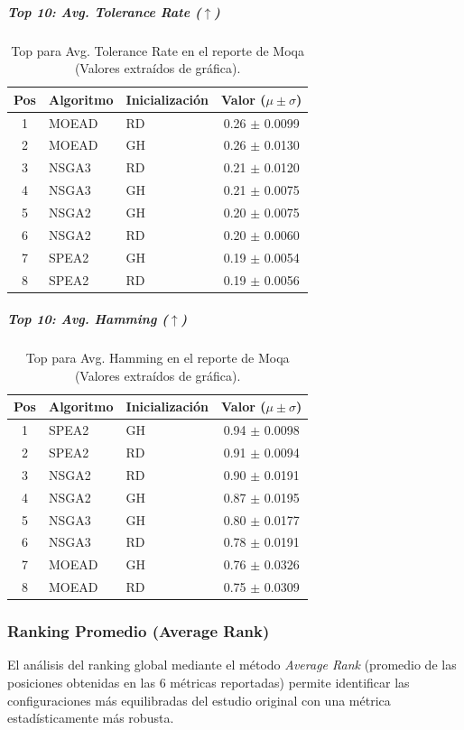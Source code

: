 \documentclass[a4paper,10pt]{article}
\begin{document}
\subparagraph{Top 10: Avg. Tolerance Rate ($\uparrow$)}
\begin{table}[H]
    \centering
    \begin{tabular}{cllc}
        \toprule
        Pos & Algoritmo & Inicialización & Valor ($\mu \pm \sigma$) \\
        \midrule
        1 & MOEAD & RD & 0.26 $\pm$ 0.0099 \\
        2 & MOEAD & GH & 0.26 $\pm$ 0.0130 \\
        3 & NSGA3 & RD & 0.21 $\pm$ 0.0120 \\
        4 & NSGA3 & GH & 0.21 $\pm$ 0.0075 \\
        5 & NSGA2 & GH & 0.20 $\pm$ 0.0075 \\
        6 & NSGA2 & RD & 0.20 $\pm$ 0.0060 \\
        7 & SPEA2 & GH & 0.19 $\pm$ 0.0054 \\
        8 & SPEA2 & RD & 0.19 $\pm$ 0.0056 \\
        \bottomrule
    \end{tabular}
    \caption{Top para Avg. Tolerance Rate en el reporte de Moqa (Valores extraídos de gráfica).}
\end{table}

\subparagraph{Top 10: Avg. Hamming ($\uparrow$)}
\begin{table}[H]
    \centering
    \begin{tabular}{cllc}
        \toprule
        Pos & Algoritmo & Inicialización & Valor ($\mu \pm \sigma$) \\
        \midrule
        1 & SPEA2 & GH & 0.94 $\pm$ 0.0098 \\
        2 & SPEA2 & RD & 0.91 $\pm$ 0.0094 \\
        3 & NSGA2 & RD & 0.90 $\pm$ 0.0191 \\
        4 & NSGA2 & GH & 0.87 $\pm$ 0.0195 \\
        5 & NSGA3 & GH & 0.80 $\pm$ 0.0177 \\
        6 & NSGA3 & RD & 0.78 $\pm$ 0.0191 \\
        7 & MOEAD & GH & 0.76 $\pm$ 0.0326 \\
        8 & MOEAD & RD & 0.75 $\pm$ 0.0309 \\
        \bottomrule
    \end{tabular}
    \caption{Top para Avg. Hamming en el reporte de Moqa (Valores extraídos de gráfica).}
\end{table}

\subsubsection{Ranking Promedio (Average Rank)}
El análisis del ranking global mediante el método \textit{Average Rank} (promedio de las posiciones obtenidas en las 6 métricas reportadas) permite identificar las configuraciones más equilibradas del estudio original con una métrica estadísticamente más robusta.
\end{document}
